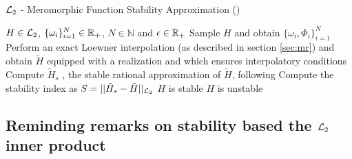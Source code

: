 \documentclass[graybox]{svmult}
\begin{document}
\begin{algorithm}[h]
	\caption{${\mathcal{L}_{2}}$ - Meromorphic Function Stability Approximation (\mfsa) } \label{algo:MFSA} 
	\begin{algorithmic}[1]
		\REQUIRE $H\in{\mathcal{L}_{2}}$, $\{\omega_i\}_{i=1}^N \in \mathbb{R}_+$, $N\in \mathbb N$ and $\epsilon\in\mathbb{R}_+$
		\STATE Sample $H$ and obtain $\{\omega_i, \Phi_i\}_{i=1}^N$
		\STATE Perform an exact Loewner interpolation (as described in section \ref{sec:mr}) and obtain $\tilde H$ equipped with a realization and which ensures interpolatory conditions
		\STATE Compute $\tilde H_s$ , the stable rational approximation of $\tilde H$, following \cite{Kohler:2014} 
		\STATE Compute the stability index as $S=|| \tilde H_s-\tilde H ||_{{\mathcal{L}_{2}}}$
		\STATE $H$ is stable
		\ELSE
		\STATE $H$ is unstable
		\ENDIF
	\end{algorithmic}
\end{algorithm}

\vspace{-.8cm}

\subsection{Reminding remarks on stability based the ${\mathcal{L}_{2}}$ inner product}
\end{document}
